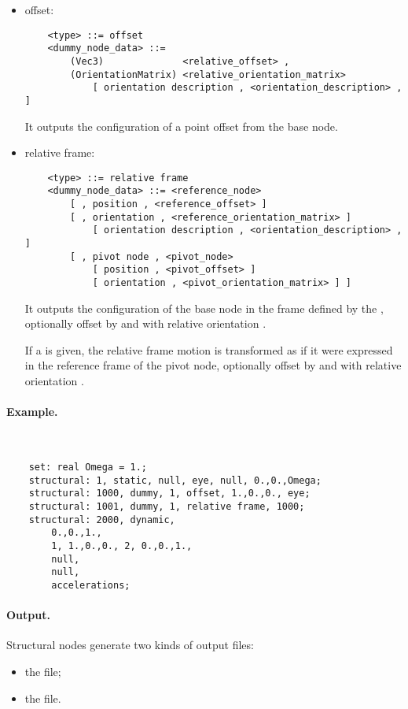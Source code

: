 \begin{itemize}
    \item offset:
    \begin{verbatim}
    <type> ::= offset
    <dummy_node_data> ::=
        (Vec3)              <relative_offset> ,
        (OrientationMatrix) <relative_orientation_matrix>
            [ orientation description , <orientation_description> , ]
    \end{verbatim}
    It outputs the configuration of a point offset from the base node.
            
    \item relative frame:
    \begin{verbatim}
    <type> ::= relative frame
    <dummy_node_data> ::= <reference_node>
        [ , position , <reference_offset> ]
        [ , orientation , <reference_orientation_matrix> ]
            [ orientation description , <orientation_description> , ]
        [ , pivot node , <pivot_node>
            [ position , <pivot_offset> ]
            [ orientation , <pivot_orientation_matrix> ] ]
    \end{verbatim}
    It outputs the configuration of the base node in the frame defined
    by the , optionally offset 
    by  and with relative orientation 
    .

    If a  is given, the relative frame motion
    is transformed as if it were expressed in the reference frame
    of the pivot node, optionally offset by 
    and with relative orientation .
\end{itemize}

\paragraph{Example.} \
\begin{verbatim}
    set: real Omega = 1.;
    structural: 1, static, null, eye, null, 0.,0.,Omega;
    structural: 1000, dummy, 1, offset, 1.,0.,0., eye;
    structural: 1001, dummy, 1, relative frame, 1000;
    structural: 2000, dynamic,
        0.,0.,1.,
        1, 1.,0.,0., 2, 0.,0.,1.,
        null,
        null,
        accelerations;
\end{verbatim}

\paragraph{Output.}
\label{sec:NODE:STRUCTURAL:OUTPUT}
Structural nodes generate two kinds of output files:
\begin{itemize}
\item the  file;
\item the  file.
\end{itemize}

